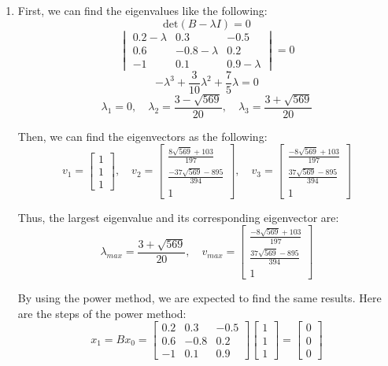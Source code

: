 \documentclass[11pt,a4paper, margin=1in]{article}
\begin{document}
\begin{enumerate}
    \item %
    First, we can find the eigenvalues like the following:
    \[
    \text{det}(B - \lambda I) = 0
    \]
    \[
    \begin{vmatrix} 0.2-\lambda & 0.3 & -0.5 \\ 0.6 & -0.8-\lambda & 0.2 \\ -1 & 0.1 & 0.9-\lambda \end{vmatrix} = 0
    \]
    \[
    -\lambda^3 + \frac{3}{10}\lambda^2 + \frac{7}{5}\lambda = 0
    \]
    \[
    \lambda_1 = 0, \quad \lambda_2 = \frac{3 -\sqrt{569}}{20}, \quad \lambda_3 = \frac{3 +\sqrt{569}}{20}
    \]
    
    Then, we can find the eigenvectors as the following:
    \[
    v_1 = \begin{bmatrix} 1 \\ 1 \\ 1 \end{bmatrix}, \quad v_2 = \begin{bmatrix} \frac{8 \sqrt{569} + 103}{197} \\ \frac{-37 \sqrt{569} - 895}{394} \\ 1 \end{bmatrix}, \quad v_3 = \begin{bmatrix} \frac{-8 \sqrt{569} + 103}{197} \\ \frac{37 \sqrt{569} - 895}{394} \\ 1 \end{bmatrix}
    \]

    Thus, the largest eigenvalue and its corresponding eigenvector are:
    \[
    \lambda_{max} = \frac{3 + \sqrt{569}}{20}, \quad v_{max} = \begin{bmatrix} \frac{-8 \sqrt{569} + 103}{197} \\ \frac{37 \sqrt{569} - 895}{394} \\ 1 \end{bmatrix}
    \]

    By using the power method, we are expected to find the same results. Here are the steps of the power method:
    \[
    x_1 = Bx_0 = \begin{bmatrix} 0.2 & 0.3 & -0.5 \\ 0.6 & -0.8 & 0.2 \\ -1 & 0.1 & 0.9 \end{bmatrix} \begin{bmatrix} 1 \\ 1 \\ 1 \end{bmatrix} = \begin{bmatrix} 0 \\ 0 \\ 0 \end{bmatrix}
    \]


\end{enumerate}
\end{document}
